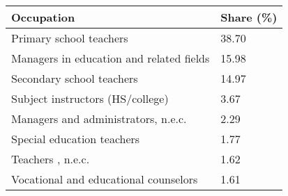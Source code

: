 

\begin{tabular}[t]{ll}
\toprule
Occupation & Share (\%)\\
\midrule
Primary school teachers & 38.70\\
Managers in education and related fields & 15.98\\
Secondary school teachers & 14.97\\
Subject instructors (HS/college) & 3.67\\
Managers and administrators, n.e.c. & 2.29\\
Special education teachers & 1.77\\
Teachers , n.e.c. & 1.62\\
Vocational and educational counselors & 1.61\\
\bottomrule
\end{tabular}

